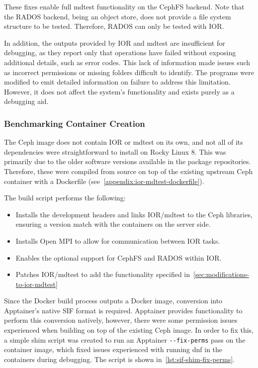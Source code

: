 These fixes enable full mdtest functionality on the \ac{CephFS} backend. Note
that the \ac{RADOS} backend, being an object store, does not provide a file
system structure to be tested. Therefore, \ac{RADOS} can only be tested with
\ac{IOR}.

In addition, the outputs provided by \ac{IOR} and mdtest are insufficient for
debugging, as they report only that operations have failed without exposing
additional details, such as error codes. This lack of information made issues
such as incorrect permissions or missing folders difficult to identify. The
programs were modified to emit detailed information on failure to address this
limitation. However, it does not affect the system's functionality and exists
purely as a debugging aid.

\subsubsection{Benchmarking Container Creation}

The Ceph image does not contain \ac{IOR} or mdtest on its own, and not all of
its dependencies were straightforward to install on Rocky Linux 8. This was
primarily due to the older software versions available in the package
repositories. Therefore, these were compiled from source on top of the existing
upstream Ceph container with a Dockerfile (see~\cref{appendix:ior-mdtest-dockerfile}).

The build script performs the following:

\begin{itemize}
    \item Installs the development headers and links \ac{IOR}/mdtest to the Ceph 
libraries, ensuring a version match with the containers on the server side.
    \item Installs Open \ac{MPI} to allow for communication between \ac{IOR} tasks.
    \item Enables the optional support for \acs{CephFS} and \acs{RADOS} within \ac{IOR}.
    \item Patches \ac{IOR}/mdtest to add the functionality specified in~\cref{sec:modifications-to-ior-mdtest}
\end{itemize}

Since the Docker build process outputs a Docker image, conversion into
Apptainer's native \ac{SIF} format is required. Apptainer provides functionality
to perform this conversion natively, however, there were some permission issues
experienced when building on top of the existing Ceph image. In order to fix
this, a simple shim script was created to run an Apptainer \texttt{-{}-fix-perms}
pass on the container image, which fixed issues experienced with running dnf in
the containers during debugging. The script is shown in~\cref{lst:sif-shim-fix-perms}.

